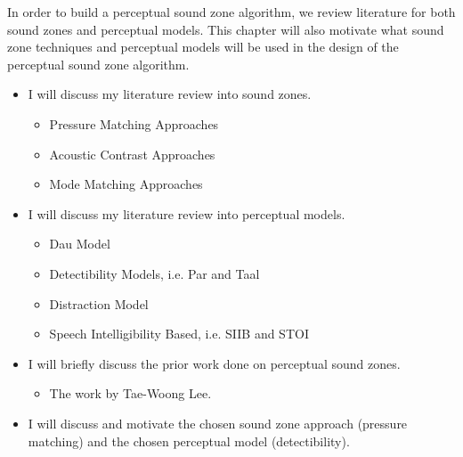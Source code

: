 In order to build a perceptual sound zone algorithm, we review literature for both sound zones and perceptual models.
This chapter will also motivate what sound zone techniques and perceptual models will be used in the design of the perceptual sound zone algorithm.
\begin{itemize}
    \item I will discuss my literature review into sound zones.
        \begin{itemize}
            \item Pressure Matching Approaches
            \item Acoustic Contrast Approaches
            \item Mode Matching Approaches
        \end{itemize}
    \item I will discuss my literature review into perceptual models.
        \begin{itemize}
            \item Dau Model
            \item Detectibility Models, i.e. Par and Taal
            \item Distraction Model
            \item Speech Intelligibility Based, i.e. SIIB and STOI
        \end{itemize}
    \item I will briefly discuss the prior work done on perceptual sound zones.
        \begin{itemize}
            \item The work by Tae-Woong Lee.
        \end{itemize}
    \item I will discuss and motivate the chosen sound zone approach (pressure matching) and the chosen perceptual model (detectibility).
\end{itemize}
